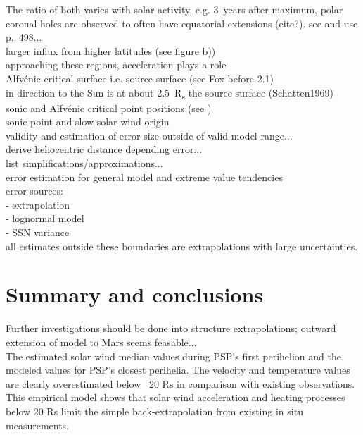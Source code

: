 The ratio of both varies with solar activity, e.g. 3~years after maximum, polar coronal holes are observed to often have equatorial extensions (cite?). see and use \citet{Bougeret1984} p.~498...\\

larger influx from higher latitudes (see figure b))\\



approaching these regions, acceleration plays a role\\
Alfvénic critical surface i.e. source surface (see Fox before 2.1)\\
in direction to the Sun is at about \SI{2.5}{R_s} the source surface (Schatten1969)\\
sonic and Alfvénic critical point positions (see \citet{Sittler1999})\\
sonic point and slow solar wind origin \citep{Sheeley1997}\\



validity and estimation of error size outside of valid model range...\\
derive heliocentric distance depending error...\\
list simplifications/approximations...\\
error estimation for general model and extreme value tendencies\\
error sources:\\
- extrapolation\\
- lognormal model\\
- SSN variance\\
all estimates outside these boundaries are extrapolations with large uncertainties.\\




\section{Summary and conclusions}

Further investigations should be done into structure extrapolations; outward extension of model to Mars seems feasable...\\

The estimated solar wind median values during PSP’s first perihelion and the modeled values for PSP’s closest perihelia. The velocity and temperature values are clearly overestimated below ~20 Rs in comparison with existing observations. This empirical model shows that solar wind acceleration and heating processes below 20 Rs limit the simple back-extrapolation from existing in situ measurements.


